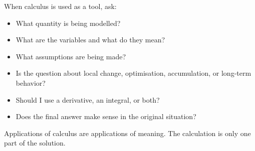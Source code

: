 \begin{summarybox}
When calculus is used as a tool, ask:
\begin{itemize}
\item What quantity is being modelled?
\item What are the variables and what do they mean?
\item What assumptions are being made?
\item Is the question about local change, optimisation, accumulation, or long-term behavior?
\item Should I use a derivative, an integral, or both?
\item Does the final answer make sense in the original situation?
\end{itemize}
\end{summarybox}

Applications of calculus are applications of meaning. The calculation is only one part of the solution.